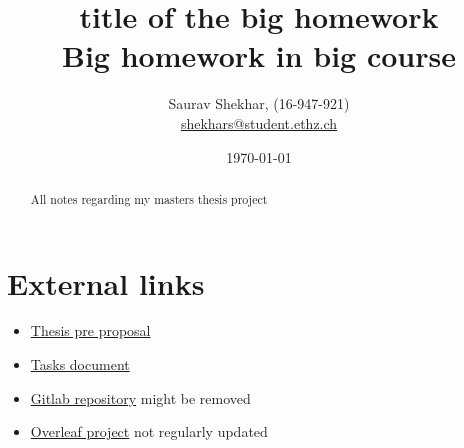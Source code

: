 \documentclass[letterpaper]{article}
\title{
  {\bf title of the big homework }\\
\large Big homework in big course }
\author{Saurav Shekhar, (16-947-921)\\
\href{mailto:shekhars@student.ethz.ch}{shekhars@student.ethz.ch}}
\date{\today}
\newcommand{\comment}[1]{\textcolor{OliveGreen}{#1}}
\begin{document}
\maketitle
\begin{abstract}
  All notes regarding my masters thesis project
\end{abstract}

\section{External links}
\begin{itemize}
  \item \href{https://docs.google.com/document/d/1GMczTKs5-JKIgxfFOKv1yJNKLoUHZ0pqwR15xZcgyYQ/edit?usp=sharing}{Thesis pre proposal}
  \item \href{https://docs.google.com/document/d/1Ytcuj1QJ8Xs5gzXVYbvcsjwsGGyz7HEg0_nCRAXjbgg/edit}{Tasks document}
  \item \href{https://gitlab.ethz.ch/shekhars/msc-thesis}{Gitlab repository} \comment{might be removed}
  \item \href{https://www.overleaf.com/9925566564xbszbcfbycnd}{Overleaf project} \comment{not regularly updated}
\end{itemize}

 \newpage

 \newpage

 \newpage

\newpage






\end{document}
